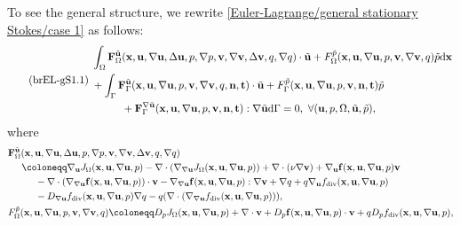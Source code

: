 \documentclass[oneside,11pt]{book}
\numberwithin{equation}{section}
\begin{document}
\begin{enumerate}[leftmargin=0mm]
\begin{itemize}[leftmargin=0in]
        To see the general structure, we rewrite \eqref{Euler-Lagrange/general stationary Stokes/case 1} as follows:
        \begin{equation}
           \label{brief Euler-Lagrange/general stationary Stokes/case 1.1}
           \tag{brEL-gS1.1}
            \left.\begin{split}
                &\int_\Omega {\bf F}_\Omega^{\tilde{\bf u}}({\bf x},{\bf u},\nabla{\bf u},\Delta{\bf u},p,\nabla p,{\bf v},\nabla{\bf v},\Delta{\bf v},q,\nabla q)\cdot\tilde{\bf u} + F_\Omega^{\tilde{p}}({\bf x},{\bf u},\nabla{\bf u},p,{\bf v},\nabla{\bf v},q)\tilde{p}{\rm d}{\bf x}\\
                &+ \int_\Gamma {\bf F}_\Gamma^{\tilde{\bf u}}({\bf x},{\bf u},\nabla{\bf u},p,{\bf v},\nabla{\bf v},q,{\bf n},{\bf t})\cdot\tilde{\bf u} + F_\Gamma^{\tilde{p}}({\bf x},{\bf u},\nabla{\bf u},p,{\bf v},{\bf n},{\bf t})\tilde{p}\\
                &\hspace{1cm}+ {\bf F}_\Gamma^{\nabla\tilde{\bf u}}({\bf x},{\bf u},\nabla{\bf u},p,{\bf v},{\bf n},{\bf t}):\nabla\tilde{\bf u}{\rm d}\Gamma = 0,\ \forall({\bf u},p,\Omega,\tilde{\bf u},\tilde{p}),
            \end{split}\right.
        \end{equation}
        where
        \begin{align*}
            &{\bf F}_\Omega^{\tilde{\bf u}}({\bf x},{\bf u},\nabla{\bf u},\Delta{\bf u},p,\nabla p,{\bf v},\nabla{\bf v},\Delta{\bf v},q,\nabla q)\\
            &\hspace{5mm}\coloneqq\nabla_{\bf u}J_\Omega({\bf x},{\bf u},\nabla{\bf u},p) - \nabla\cdot(\nabla_{\nabla{\bf u}}J_\Omega({\bf x},{\bf u},\nabla{\bf u},p)) + \nabla\cdot(\nu\nabla{\bf v}) + \nabla_{\bf u}{\bf f}({\bf x},{\bf u},\nabla{\bf u},p){\bf v}\\
            &\hspace{1cm}- \nabla\cdot(\nabla_{\nabla{\bf u}}{\bf f}({\bf x},{\bf u},\nabla{\bf u},p))\cdot{\bf v} - \nabla_{\nabla{\bf u}}{\bf f}({\bf x},{\bf u},\nabla{\bf u},p):\nabla{\bf v} + \nabla q + q\nabla_{\bf u}f_{\rm div}({\bf x},{\bf u},\nabla{\bf u},p)\\
            &\hspace{1cm}- D_{\nabla{\bf u}}f_{\rm div}({\bf x},{\bf u},\nabla{\bf u},p)\nabla q - q(\nabla\cdot(\nabla_{\nabla{\bf u}}f_{\rm div}({\bf x},{\bf u},\nabla{\bf u},p))),\\
            &F_\Omega^{\tilde{p}}({\bf x},{\bf u},\nabla{\bf u},p,{\bf v},\nabla{\bf v},q)\coloneqq D_pJ_\Omega({\bf x},{\bf u},\nabla{\bf u},p) + \nabla\cdot{\bf v} + D_p{\bf f}({\bf x},{\bf u},\nabla{\bf u},p)\cdot{\bf v} + qD_pf_{\rm div}({\bf x},{\bf u},\nabla{\bf u},p),\\

\end{align*}
\end{itemize}
\end{enumerate}
\end{document}
